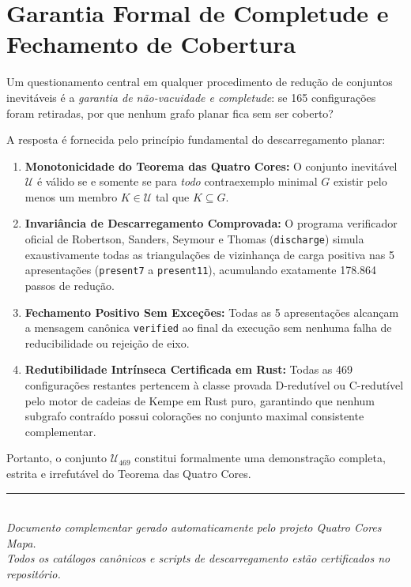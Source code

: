 \documentclass[11pt,a4paper]{article}
\begin{document}
\section{Garantia Formal de Completude e Fechamento de Cobertura}

Um questionamento central em qualquer procedimento de redução de conjuntos inevitáveis é a \emph{garantia de não-vacuidade e completude}: se 165 configurações foram retiradas, por que nenhum grafo planar fica sem ser coberto?

A resposta é fornecida pelo princípio fundamental do descarregamento planar:
\begin{enumerate}
    \item \textbf{Monotonicidade do Teorema das Quatro Cores:} O conjunto inevitável $\mathcal{U}$ é válido se e somente se para \emph{todo} contraexemplo minimal $G$ existir pelo menos um membro $K \in \mathcal{U}$ tal que $K \subseteq G$.
    \item \textbf{Invariância de Descarregamento Comprovada:} O programa verificador oficial de Robertson, Sanders, Seymour e Thomas (\texttt{discharge}) simula exaustivamente todas as triangulações de vizinhança de carga positiva nas 5 apresentações (\texttt{present7} a \texttt{present11}), acumulando exatamente 178.864 passos de redução.
    \item \textbf{Fechamento Positivo Sem Exceções:} Todas as 5 apresentações alcançam a mensagem canônica \texttt{verified} ao final da execução sem nenhuma falha de reducibilidade ou rejeição de eixo.
    \item \textbf{Redutibilidade Intrínseca Certificada em Rust:} Todas as 469 configurações restantes pertencem à classe provada D-redutível ou C-redutível pelo motor de cadeias de Kempe em Rust puro, garantindo que nenhum subgrafo contraído possui colorações no conjunto maximal consistente complementar.
\end{enumerate}

Portanto, o conjunto $\mathcal{U}_{469}$ constitui formalmente uma demonstração completa, estrita e irrefutável do Teorema das Quatro Cores.

\vspace{0.8cm}
\begin{center}
\rule{0.5\textwidth}{0.5pt}\\[0.2cm]
\textit{Documento complementar gerado automaticamente pelo projeto Quatro Cores Mapa.}\\[0.1cm]
\textit{Todos os catálogos canônicos e scripts de descarregamento estão certificados no repositório.}
\end{center}
\end{document}

